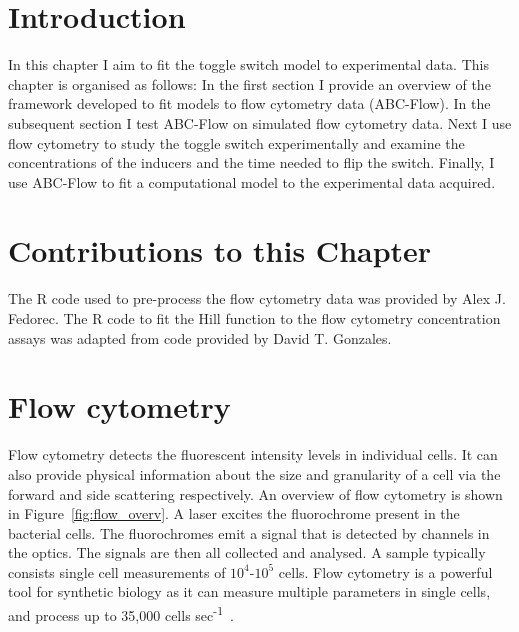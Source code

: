 \section{Introduction}

In this chapter I aim to fit the toggle switch model to experimental data. This chapter is organised as follows: In the first section I provide an overview of the framework developed to fit models to flow cytometry data (ABC-Flow). In the subsequent section I test ABC-Flow on simulated flow cytometry data. Next I use flow cytometry to study the toggle switch experimentally and examine the concentrations of the inducers and the time needed to flip the switch. Finally, I use ABC-Flow to fit a computational model to the experimental data acquired.


\section{Contributions to this Chapter}

The R code used to pre-process the flow cytometry data was provided by Alex J. Fedorec. The R code to fit the Hill function to the flow cytometry concentration assays was adapted from code provided by David T. Gonzales. 

\section{Flow cytometry}
Flow cytometry detects the fluorescent intensity levels in individual cells. It can also provide physical information about the size and granularity of a cell via the forward and side scattering respectively. An overview of flow cytometry is shown in Figure~\ref{fig:flow_overv}. A laser excites the fluorochrome present in the bacterial cells. The fluorochromes emit a signal that is detected by channels in the optics. The signals are then all collected and analysed. A sample typically consists single cell measurements of $10^4$-$10^5$ cells. %
Flow cytometry is a powerful tool for synthetic biology as it can measure multiple parameters in single cells, and process up to 35,000 cells sec\textsuperscript{-1}~\autocite{Anonymous:2015tj}. 


